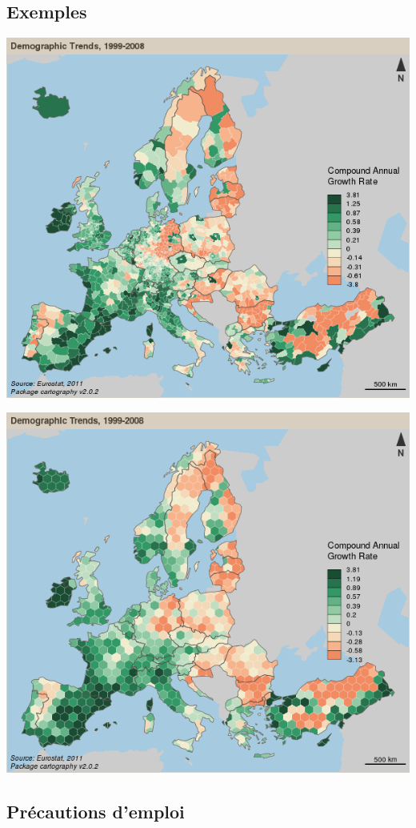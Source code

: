 \documentclass[]{book}
\begin{document}
\hypertarget{exemples}{%
\subsection{Exemples}\label{exemples}}

\includegraphics{img/pregrid.png}

\includegraphics{img/grid.png}

\hypertarget{precautions-demploi-3}{%
\subsection{Précautions d'emploi}\label{precautions-demploi-3}}
\end{document}
